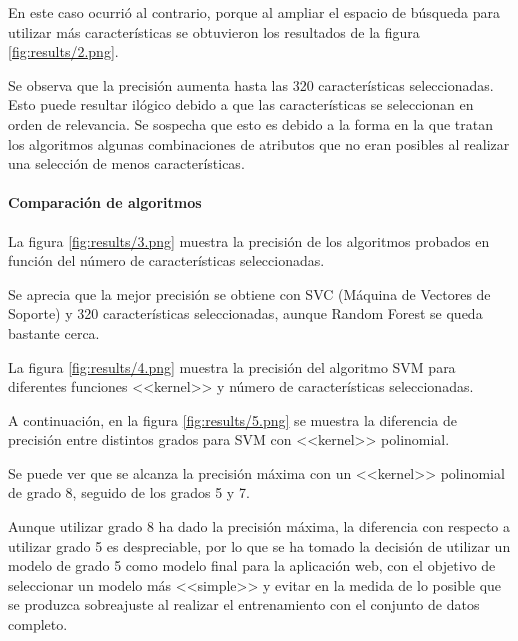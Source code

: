 En este caso ocurrió al contrario, porque al ampliar el espacio de búsqueda para
utilizar más características se obtuvieron los resultados de la figura
\ref{fig:results/2.png}.


Se observa que la precisión aumenta hasta las 320 características seleccionadas.
Esto puede resultar ilógico debido a que las características se seleccionan en
orden de relevancia. Se sospecha que esto es debido a la forma en la que tratan los
algoritmos algunas combinaciones de atributos que no eran posibles al realizar
una selección de menos características.

\paragraph{Comparación de algoritmos}

La figura \ref{fig:results/3.png} muestra la precisión de los algoritmos
probados en función del número de características seleccionadas.


Se aprecia que la mejor precisión se obtiene con SVC (Máquina de Vectores de
Soporte) y 320 características seleccionadas, aunque Random Forest se queda
bastante cerca.

La figura \ref{fig:results/4.png} muestra la precisión del algoritmo SVM para
diferentes funciones <<kernel>> y número de características seleccionadas.


A continuación, en la figura \ref{fig:results/5.png} se muestra la diferencia de
precisión entre distintos grados para SVM con <<kernel>> polinomial.


Se puede ver que se alcanza la precisión máxima con un <<kernel>> polinomial de
grado 8, seguido de los grados 5 y 7. 

Aunque utilizar grado 8 ha dado la precisión máxima, la diferencia con respecto
a utilizar grado 5 es despreciable, por lo que se ha tomado la decisión de
utilizar un modelo de grado 5 como modelo final para la aplicación web, con el
objetivo de seleccionar un modelo más <<simple>> y evitar en la medida de lo
posible que se produzca sobreajuste al realizar el entrenamiento con el conjunto
de datos completo.

